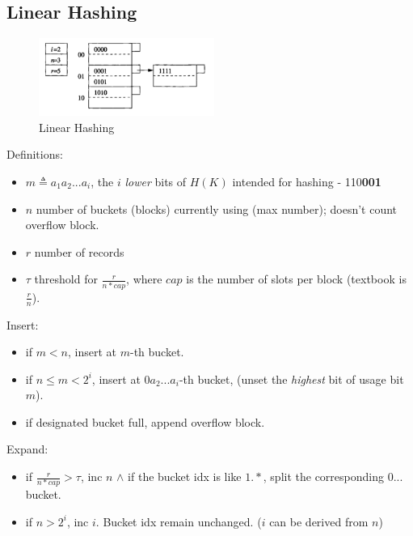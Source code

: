 \documentclass[a4paper]{report}
\begin{document}
\subsection{Linear Hashing}
\begin{figure}[H]
        \centerline{\includegraphics[height = 1in]{img/linearhashing}}
        \caption{Linear Hashing}
    \label{fig:linearHashing}
\end{figure}
Definitions:
\begin{itemize}
\item $m \triangleq a_1a_2...a_i$, the $i$ \textit{lower} bits of $H(K)$ intended for hashing - 110\textbf{001}
\item $n$ number of buckets (blocks) currently using (max number); doesn't count overflow block. 
\item $r$ number of records
\item $\tau$ threshold for $\frac{r}{n*cap}$, where $cap$ is the number of slots per block (textbook is $\frac{r}{n}$).
\end{itemize}
Insert: 
\begin{itemize}
\item if $m<n$, insert at $m$-th bucket.
\item if $n\leq m < 2^i$, insert at $0a_2...a_i$-th bucket, (unset the \textit{highest} bit of usage bit $m$).
\item if designated bucket full, append overflow block. 
\end{itemize}
Expand:
\begin{itemize}
\item if $\frac{r}{n*cap}>\tau$, inc $n$ $\wedge$ if the bucket idx is like $1.*$, split the corresponding $0...$ bucket. 
\item if $n>2^i$, inc $i$. Bucket idx remain unchanged. ($i$ can be derived from $n$) 
\end{itemize}
\end{document}
